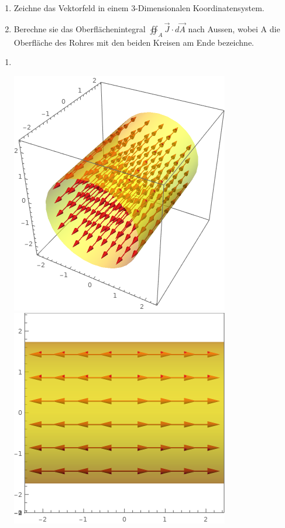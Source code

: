 \begin{enumerate}
	\item  Zeichne das Vektorfeld in einem 3-Dimensionalen Koordinatensystem. \\
	\item Berechne sie das Oberflächenintegral $ \oiint_A \vec{J} \cdot d\vec{A}$ nach Aussen, wobei A die Oberfläche des Rohres mit den beiden Kreisen am Ende bezeichne.
\end{enumerate}
\iend

\newpage

\beginbsp
\begin{enumerate}
	\item  \
	\begin{center}

	      \includegraphics[scale=0.4]{plot.png}
	      \includegraphics[scale=0.3]{plot2.png}


\end{center}
\end{enumerate}
